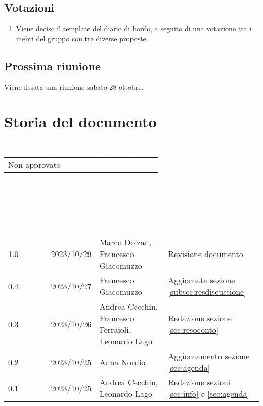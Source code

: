 \documentclass[12pt]{article}
\begin{document}
\begin{enumerate}
\end{enumerate}

\subsection{Votazioni} \label{subsec:resvotazione}
\begin{enumerate}
    \item Viene deciso il template del diario di bordo, a seguito di una votazione tra i mebri del gruppo con tre diverse proposte.
\end{enumerate}

\subsection{Prossima riunione} \label{subsec:riunione}
Viene fissata una riunione sabato 28 ottobre.

\section{Storia del documento} \label{sec:storia}
\begingroup
\setlength{\tabcolsep}{10pt}
\renewcommand{\arraystretch}{1.5}
\begin{tabularx}{\textwidth}{| X | X |}
    \hline
    \rowcolor{headerrow} \textbf{\textcolor{white}{Stato del documento}} & \textbf{\textcolor{white}{Responsabile}} \\
    \hline
    Non approvato &\\
    \hline   
\end{tabularx}
\\\\\\
\begin{tabularx}{\textwidth}{| l | l | X | X |}
    \hline
    \rowcolor{headerrow} \textbf{\textcolor{white}{Versione}} & \textbf{\textcolor{white}{Data}} & \textbf{\textcolor{white}{Autori}} & \textbf{\textcolor{white}{Descrizione}} \\
    \hline
    1.0 & 2023/10/29 & Marco Dolzan, Francesco Giacomuzzo & Revisione documento \\
    \hline
    0.4 & 2023/10/27 & Francesco Giacomuzzo & Aggiornata sezione \ref{subsec:resdiscussione}\\
    \hline
    0.3 & 2023/10/26 & Andrea Cecchin, Francesco Ferraioli, Leonardo Lago & Redazione sezione \ref{sec:resoconto}\\
    \hline
    0.2 & 2023/10/25 & Anna Nordio & Aggiornamento sezione \ref{sec:agenda}\\
    \hline
    0.1 & 2023/10/25 & Andrea Cecchin, Leonardo Lago & Redazione sezioni \ref{sec:info} e \ref{sec:agenda}\\
    \hline
\end{tabularx}
\endgroup
\end{document}
